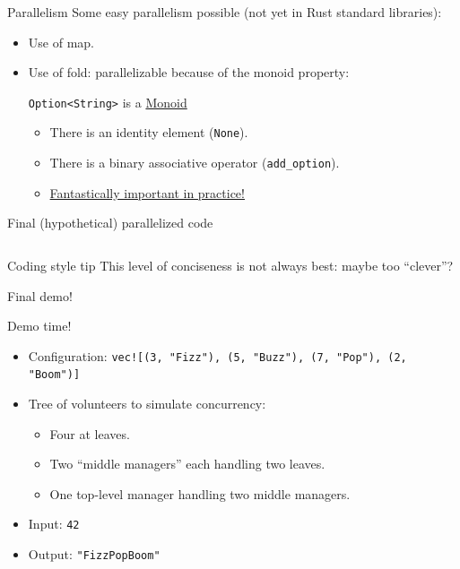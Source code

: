 \begin{frame}[fragile]{Parallelism}
  Some easy parallelism possible (not yet in Rust standard libraries):
  \begin{itemize}
  \item Use of \alert{map}.
  \item Use of \alert{fold}: parallelizable because of the monoid property:
  \begin{block}{\texttt{Option<String>} is a \href{http://en.wikipedia.org/wiki/Monoid}{Monoid}}
  \begin{itemize}
  \item There is an identity element (\texttt{None}).
  \item There is a binary associative operator (\texttt{add_option}).
  \item \href{http://www.michael-noll.com/blog/2013/12/02/twitter-algebird-monoid-monad-for-large-scala-data-analytics/}{Fantastically important in practice!}
  \end{itemize}
  \end{block}
  \end{itemize}
\end{frame}

\begin{frame}[fragile]{Final (hypothetical) parallelized code}
  \inputminted{rust}{FizzBuzz9.rs}

  \begin{block}{Coding style tip}
    This level of conciseness is not always best: maybe too ``clever''?
  \end{block}
\end{frame}

\begin{frame}[fragile]{Final demo!}
  \begin{block}{Demo time!}
    \begin{itemize}
    \item Configuration: \texttt{vec![(3, "Fizz"), (5, "Buzz"), (7, "Pop"), (2, "Boom")]}
    \item Tree of volunteers to simulate concurrency:
      \begin{itemize}
      \item Four at leaves.
      \item Two ``middle managers'' each handling two leaves.
      \item One top-level manager handling two middle managers.
      \end{itemize}
    \item Input: \texttt{42}
    \item Output: \texttt{"FizzPopBoom"}
    \end{itemize}
  \end{block}
\end{frame}

